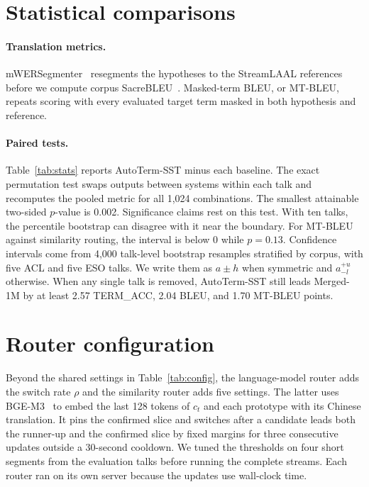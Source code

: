 \section{Statistical comparisons}
\label{app:stats}

\paragraph{Translation metrics.}
mWERSegmenter~\citep{matusov-etal-2005-evaluating} resegments the hypotheses
to the StreamLAAL references~\citep{papi2024streamatt} before we compute
corpus SacreBLEU~\citep{papineni-etal-2002-bleu,post-2018-call}.
Masked-term BLEU, or MT-BLEU, repeats scoring with every evaluated target
term masked in both hypothesis and reference.

\paragraph{Paired tests.}
Table~\ref{tab:stats} reports AutoTerm-SST minus each baseline. The exact
permutation test swaps outputs between systems within each talk and recomputes
the pooled metric for all 1,024 combinations. The smallest
attainable two-sided $p$-value is 0.002. Significance claims rest on this test.
With ten talks, the percentile bootstrap can disagree with it near the boundary.
For MT-BLEU against similarity routing, the interval is below $0$ while $p=0.13$.
Confidence intervals come from 4,000 talk-level bootstrap resamples
stratified by corpus, with five ACL and five ESO talks. We write them as
$a\pm h$ when symmetric and $a^{+u}_{-l}$ otherwise.
When any single talk is removed, AutoTerm-SST still leads Merged-1M by at least
2.57 TERM\_ACC, 2.04 BLEU, and 1.70 MT-BLEU points.

\section{Router configuration}
\label{app:config}

Beyond the shared settings in Table~\ref{tab:config}, the language-model router
adds the switch rate $\rho$ and the similarity router adds five settings. The
latter uses BGE-M3~\citep{chen-etal-2024-m3} to embed the last 128 tokens of $c_t$
and each prototype with its Chinese translation. It pins the confirmed slice
and switches after a candidate leads both the runner-up and the confirmed slice
by fixed margins for three consecutive updates outside a 30-second cooldown.
We tuned the thresholds on four short segments from the evaluation talks before
running the complete streams. Each router ran on its own server because
the updates use wall-clock time.

